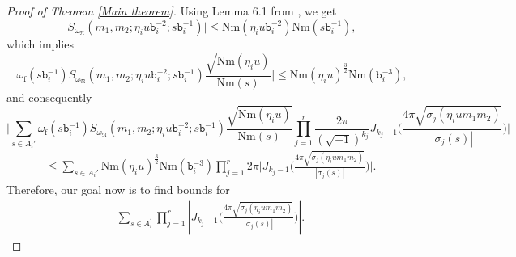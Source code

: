 \documentclass[reqno]{amsart}
\theoremstyle{plain}
\theoremstyle{definition}
\theoremstyle{remark}
\def\Nr{\mathrm{Nm}}
\def\b{\mathtt b}
\def\mp{m_{1}m_{2}}
\def\mc{m_{1},m_{2}}
\begin{document}
\begin{proof}[Proof of Theorem \ref{Main theorem}]
 Using Lemma 6.1 from \cite{KL}, we get $$ \Big|S_{\omega_\mathfrak{N}} (\mc;\eta_i u \b_i^{-2};s\b_i^{-1})\Big|\leq \Nr(\eta_i u\b_i^{-2})\Nr(s\b_i^{-1}),$$  which implies   
 $$ \Bigg|\omega_{\mathrm{f}}(s\b_i^{-1} ) S_{\omega_\mathfrak{N}} (\mc;\eta_i u \b_i^{-2};s\b_i^{-1})
 \frac{\sqrt{\Nr(\eta_i u)}}{\Nr(s)}\Bigg|\leq \Nr(\eta_i u)^{\frac{3}{2}}\Nr(\b_i^{-3}),$$ and consequently
 $$
\Bigg| \sum_{s\in A_i' }\omega_{\mathrm{f}}(s\b_i^{-1} ) S_{\omega_\mathfrak{N}} (\mc;\eta_i u \b_i^{-2};s\b_i^{-1})
 \frac{\sqrt{\Nr(\eta_i u)}}{\Nr(s)}
 \prod_{j=1}^r\frac{2\pi}{(\sqrt{-1})^{k_j}}J_{k_j-1} \Big(  \frac{4 \pi\sqrt{\sigma_j (\eta_i u \mp )}}{|\sigma_j(s)|}\Big)     \Bigg|$$
\begin{align}\label{Ai'raw}
\leq 
 \sum_{s\in A_i' }  \Nr(\eta_i u)^{\frac{3}{2}}\Nr(\b_i^{-3}) \prod_{j=1}^r2\pi \Bigg| J_{k_j-1} \Big(  \frac{4 \pi \sqrt{\sigma_j (\eta_i u \mp )}}{|\sigma_j(s)|}\Big)\Bigg|
 .\end{align}
Therefore, our goal now is to find bounds for 
\begin{align*}
\sum_{s\in A^\prime_{i} }    \prod_{j=1}^r\left| J_{k_j-1} \Big(  \frac{4 \pi\sqrt{\sigma_j (\eta_i u m_1m_2 )}}{|\sigma_j(s)|}\Big)\right|.
\end{align*}



\end{proof}
\end{document}
